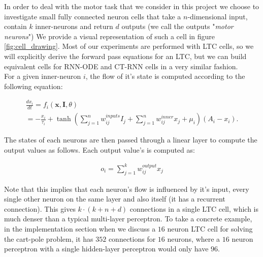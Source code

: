 In order to deal with the motor task that we consider in this project we choose to investigate small fully connected neuron cells that take a $n$-dimensional input, contain $k$ inner-neurons and return $d$ outputs (we call the outputs "\textit{motor neurons}") We provide a visual representation of such a cell in figure \ref{fig:cell_drawing}. Most of our experiments are performed with LTC cells, so we will explicitly derive the forward pass equations for an LTC, but we can build equivalent cells for RNN-ODE and CT-RNN cells in a very similar fashion.\\

For a given inner-neuron $i$, the flow of it's state is computed according to the following equation: 

\begin{footnotesize}
    \begin{align*}
        \frac{dx_i}{dt} = f_i(\textbf{x},\textbf{I},\theta)\\
        = - \frac{x_i}{\tau_i} +
        \tanh \left( \sum_{j=1}^{n} w_{ij}^\textit{inputs} I_j +\sum_{j=1}^{n} w_{ij}^\textit{inner} x_j  +\mu_i\right) (A_i-x_i).
    \end{align*}
\end{footnotesize}

The states of each neurons are then passed through a linear layer to compute the output values as follows. Each output value's is computed as:

\begin{align*}
    o_i =  \sum_{j=1}^{k} w_{ij}^\textit{output} x_j 
\end{align*}

Note that this implies that each neuron's flow is influenced by it's input, every single other neuron on the same layer and also itself (it has a recurrent connection). This gives $k\cdot(k+n+d)$ connections in a single LTC cell, which is much denser than a typical multi-layer perceptron. To take a concrete example, in the implementation section when we discuss a $16$ neuron LTC cell for solving the cart-pole problem, it has $352$ connections for $16$ neurons, where a $16$ neuron perceptron with a single hidden-layer perceptron would only have $96$.